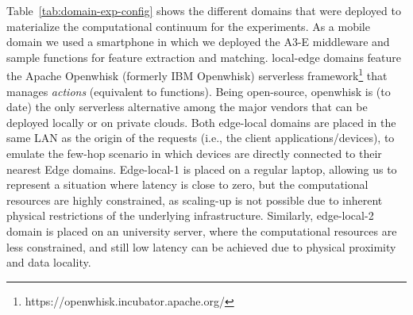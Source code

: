 Table~\ref{tab:domain-exp-config} shows the different domains that were deployed to materialize the computational continuum for the experiments. As a mobile domain we used a smartphone in which we deployed the A3-E middleware and sample functions for feature extraction and matching. local-edge domains feature the Apache Openwhisk (formerly IBM Openwhisk) serverless framework\footnote{https://openwhisk.incubator.apache.org/} that manages {\em actions} (equivalent to functions). Being open-source, openwhisk is (to date) the only serverless alternative among the major vendors that can be deployed locally or on private clouds. 
Both edge-local domains are placed in the same LAN as the origin of the requests (i.e., the client applications/devices), to emulate the few-hop scenario in which devices are directly connected to their nearest Edge domains. Edge-local-1 is placed on a regular laptop, allowing us to represent a situation where latency is close to zero, but the computational resources are highly constrained, as scaling-up is not possible due to inherent physical restrictions of the underlying infrastructure. Similarly, edge-local-2 domain is placed on an university server, where the computational resources are less constrained, and still low latency can be achieved due to physical proximity and data locality.




